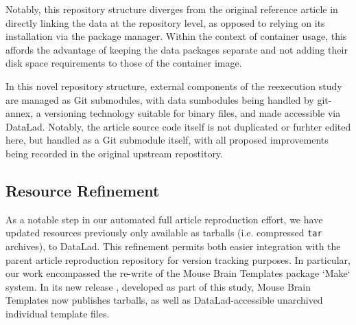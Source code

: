 Notably, this repository structure diverges from the original reference article in directly linking the data at the repository level, as opposed to relying on its installation via the package manager.
Within the context of container usage, this affords the advantage of keeping the data packages separate and not adding their disk space requirements to those of the container image.

In this novel repository structure, external components of the reexecution study are managed as Git submodules, with data sumbodules being handled by git-annex, a versioning technology suitable for binary files, and made accessible via DataLad.
Notably, the article source code itself is not duplicated or furhter edited here, but handled as a Git submodule itself, with all proposed improvements being recorded in the original upstream repostitory.


\subsection{Resource Refinement}

As a notable step in our automated full article reproduction effort, we have updated resources previously only available as tarballs (i.e. compressed \texttt{tar} archives), to DataLad.
This refinement permits both easier integration with the parent article reproduction repository for version tracking purposes.
In particular, our work encompassed the re-write of the Mouse Brain Templates package \cite{mbt05}  `Make` system.
In its new release \cite{mbt10}, developed as part of this study, Mouse Brain Templates now publishes tarballs, as well as DataLad-accessible unarchived individual template files.

